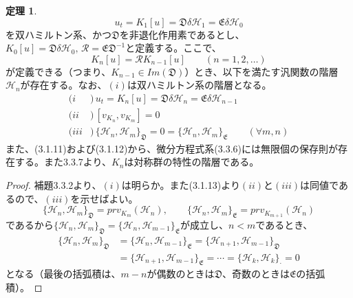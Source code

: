 \documentclass[a4paper, 11pt]{report}
\theoremstyle{definition}
\newtheorem{theorem}{定理}[section]
\begin{document}
\begin{theorem}
\begin{equation}
u_t = K_1[u] = \mathfrak{D}\delta\mathcal{H}_1 = \mathfrak{E}\delta\mathcal{H}_0  %
\end{equation}
を双ハミルトン系、かつ$\mathfrak{D}$を非退化作用素であるとし、$K_0[u]=\mathfrak{D}\delta\mathcal{H}_0, \, \mathcal{R}=\mathfrak{E}\mathfrak{D}^{-1}$と定義する。ここで、
\begin{equation*}
K_n[u] = \mathcal{R}K_{n-1}[u] \qquad (n=1,2,\dots)
\end{equation*}
が定義できる（つまり、$K_{n-1}\in Im(\mathfrak{D})$）とき、以下を満たす汎関数の階層$\mathcal{H}_n$が存在する。なお、$(i)$は双ハミルトン系の階層となる。
\begin{align}
(i  &)\, u_t = K_n[u] = \mathfrak{D}\delta\mathcal{H}_n = \mathfrak{E}\delta\mathcal{H}_{n-1}\\  %
(ii &)\, [v_{K_n},v_{K_m}] = 0\\  %
(iii&)\, \{ \mathcal{H}_n,\mathcal{H}_m \}_\mathfrak{D} = 0 = \{ \mathcal{H}_n,\mathcal{H}_m \}_\mathfrak{E} \qquad (\forall m,n)  %
\end{align}
 また、(3.1.11)および(3.1.12)から、微分方程式系(3.3.6)には無限個の保存則が存在する。また3.3.7より、$K_n$は対称群の特性の階層である。
\end{theorem}

\begin{proof}
 補題3.3.2より、$(i)$は明らか。また(3.1.13)より$(ii)$と$(iii)$は同値であるので、$(iii)$を示せばよい。
\begin{equation*}
\{ \mathcal{H}_n,\mathcal{H}_m\}_\mathfrak{D} = prv_{K_m}(\mathcal{H}_n),\qquad \{ \mathcal{H}_n,\mathcal{H}_m\}_\mathfrak{E} = prv_{K_{m+1}}(\mathcal{H}_n)
\end{equation*}
であるから$\{\mathcal{H}_n,\mathcal{H}_m\}_\mathfrak{D}=\{\mathcal{H}_n,\mathcal{H}_{m-1}\}_\mathfrak{E}$が成立し、$n<m$であるとき、
\begin{align*}
\{\mathcal{H}_n,\mathcal{H}_m\}_\mathfrak{D}&=\{\mathcal{H}_n,\mathcal{H}_{m-1}\}_\mathfrak{E}=\{\mathcal{H}_{n+1},\mathcal{H}_{m-1}\}_\mathfrak{D}\\
&=\{\mathcal{H}_{n+1},\mathcal{H}_{m-1}\}_\mathfrak{E}=\cdots=\{\mathcal{H}_k,\mathcal{H}_k\}_{\cdot}=0
\end{align*}
となる（最後の括弧積は、$m-n$が偶数のときは$\mathfrak{D}$、奇数のときは$\mathfrak{E}$の括弧積）。
\end{proof}
\end{document}
